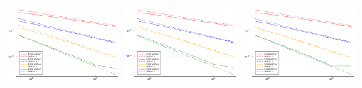 \includegraphics[width=0.32\textwidth]{pdf/pdepics/numerics/DeC_errors.pdf}
\includegraphics[width=0.32\textwidth]{pdf/pdepics/numerics/sDeC_errors.pdf}
\includegraphics[width=0.32\textwidth]{pdf/pdepics/numerics/ader_errors.pdf}
